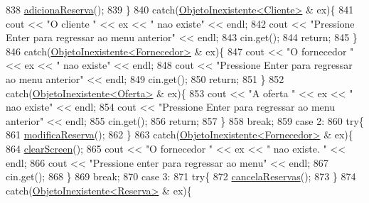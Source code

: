 \begin{DoxyCode}
838             \hyperlink{classEmpresa_a42953bdbb2fb39173ad6f38892fc122b}{adicionaReserva}();
839             \}
840             \textcolor{keywordflow}{catch}(\hyperlink{classObjetoInexistente}{ObjetoInexistente<Cliente>} & ex)\{
841                 cout << \textcolor{stringliteral}{"O cliente "} << ex << \textcolor{stringliteral}{" nao existe"} << endl;
842                 cout << \textcolor{stringliteral}{"Pressione Enter para regressar ao menu anterior"} << endl;
843                 cin.get();
844                 \textcolor{keywordflow}{return};
845             \}
846             \textcolor{keywordflow}{catch}(\hyperlink{classObjetoInexistente}{ObjetoInexistente<Fornecedor>} & ex)\{
847                 cout << \textcolor{stringliteral}{"O fornecedor "} << ex << \textcolor{stringliteral}{" nao existe"} << endl;
848                 cout << \textcolor{stringliteral}{"Pressione Enter para regressar ao menu anterior"} << endl;
849                 cin.get();
850                 \textcolor{keywordflow}{return};
851             \}
852             \textcolor{keywordflow}{catch}(\hyperlink{classObjetoInexistente}{ObjetoInexistente<Oferta>} & ex)\{
853                 cout << \textcolor{stringliteral}{"A oferta "} << ex << \textcolor{stringliteral}{" nao existe"} << endl;
854                 cout << \textcolor{stringliteral}{"Pressione Enter para regressar ao menu anterior"} << endl;
855                 cin.get();
856                 \textcolor{keywordflow}{return};
857             \}
858             \textcolor{keywordflow}{break};
859         \textcolor{keywordflow}{case} 2:
860             \textcolor{keywordflow}{try}\{
861             \hyperlink{classEmpresa_ae74f80c120a14f0591d04fe7603e6905}{modificaReserva}();
862             \}
863             \textcolor{keywordflow}{catch}(\hyperlink{classObjetoInexistente}{ObjetoInexistente<Fornecedor>} & ex)\{
864                 \hyperlink{menu_8h_aceb70c1ed7e11f0863a868704f02214b}{clearScreen}();
865                 cout << \textcolor{stringliteral}{"O fornecedor "} << ex << \textcolor{stringliteral}{" nao existe. "} << endl;
866                 cout << \textcolor{stringliteral}{"Pressione enter para regressar ao menu"} << endl;
867                 cin.get();
868             \}
869             \textcolor{keywordflow}{break};
870         \textcolor{keywordflow}{case} 3:
871             \textcolor{keywordflow}{try}\{
872             \hyperlink{classEmpresa_aa0b169a112c75b6fd1bc80128720282e}{cancelaReservas}();
873             \}
874             \textcolor{keywordflow}{catch}(\hyperlink{classObjetoInexistente}{ObjetoInexistente<Reserva>} & ex)\{

\end{DoxyCode}
